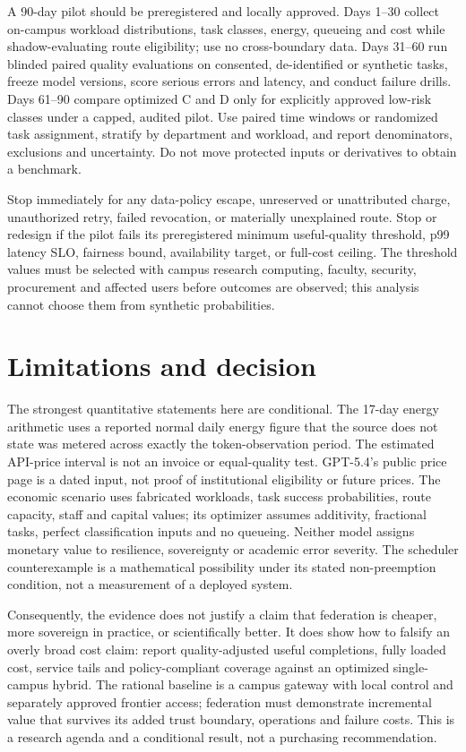 A 90-day pilot should be preregistered and locally approved. Days 1--30 collect on-campus workload distributions, task classes, energy, queueing and cost while shadow-evaluating route eligibility; use no cross-boundary data. Days 31--60 run blinded paired quality evaluations on consented, de-identified or synthetic tasks, freeze model versions, score serious errors and latency, and conduct failure drills. Days 61--90 compare optimized C and D only for explicitly approved low-risk classes under a capped, audited pilot. Use paired time windows or randomized task assignment, stratify by department and workload, and report denominators, exclusions and uncertainty. Do not move protected inputs or derivatives to obtain a benchmark.

Stop immediately for any data-policy escape, unreserved or unattributed charge, unauthorized retry, failed revocation, or materially unexplained route. Stop or redesign if the pilot fails its preregistered minimum useful-quality threshold, p99 latency SLO, fairness bound, availability target, or full-cost ceiling. The threshold values must be selected with campus research computing, faculty, security, procurement and affected users before outcomes are observed; this analysis cannot choose them from synthetic probabilities.

\section{Limitations and decision}
The strongest quantitative statements here are conditional. The 17-day energy arithmetic uses a reported normal daily energy figure that the source does not state was metered across exactly the token-observation period. The estimated API-price interval is not an invoice or equal-quality test. GPT-5.4's public price page is a dated input, not proof of institutional eligibility or future prices. The economic scenario uses fabricated workloads, task success probabilities, route capacity, staff and capital values; its optimizer assumes additivity, fractional tasks, perfect classification inputs and no queueing. Neither model assigns monetary value to resilience, sovereignty or academic error severity. The scheduler counterexample is a mathematical possibility under its stated non-preemption condition, not a measurement of a deployed system.

Consequently, the evidence does not justify a claim that federation is cheaper, more sovereign in practice, or scientifically better. It does show how to falsify an overly broad cost claim: report quality-adjusted useful completions, fully loaded cost, service tails and policy-compliant coverage against an optimized single-campus hybrid. The rational baseline is a campus gateway with local control and separately approved frontier access; federation must demonstrate incremental value that survives its added trust boundary, operations and failure costs. This is a research agenda and a conditional result, not a purchasing recommendation.

